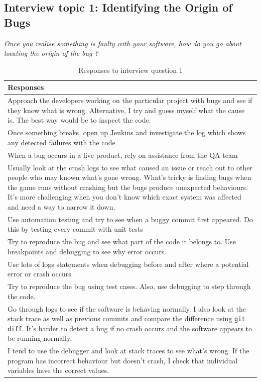 \documentclass[../main.tex]{subfiles}
\begin{document}
\subsection{Interview topic 1: Identifying the Origin of Bugs}

\textit{Once you realise something is faulty with your software, how do you go about locating the origin of the bug ?}

\begin{table}[H]
\centering
\caption{Responses to interview question 1}
    \begin{tabular}{|p{15cm}|}
        \hline
        \textbf{Responses}\\ 
        \hline\hline
        Approach the developers working on the particular project with bugs and see if they know what is wrong. Alternative, I try and guess myself what the cause is. The best way would be to inspect the code.\\
        \hline
        Once something breaks, open up Jenkins and investigate the log which shows any detected failures with the code\\
        \hline
        When a bug occurs in a live product, rely on assistance from the QA team\\
        \hline
        Usually look at the crash logs to see what caused an issue or reach out to other people who may known what's gone wrong. What's tricky is finding bugs when the game runs without crashing but the bugs produce unexpected behaviours. It's more challenging when you don't know which exact system was affected and need a way to narrow it down.\\
        \hline
        Use automation testing and try to see when a buggy commit first appeared. Do this by testing every commit with unit tests\\
        \hline
        Try to reproduce the bug and see what part of the code it belongs to. Use breakpoints and debugging to see why error occurs.\\
        \hline
        Use lots of logs statements when debugging before and after where a potential error or crash occurs\\
        \hline
        Try to reproduce the bug using test cases. Also, use debugging to step through the code.\\
        \hline
        Go through logs to see if the software is behaving normally. I also look at the stack trace as well as previous commits and compare the difference using \texttt{git diff}. It's harder to detect a bug if no crash occurs and the software appears to be running normally. \\
        \hline
        I tend to use the debugger and look at stack traces to see what's wrong. If the program has incorrect behaviour but doesn't crash, I check that individual variables have the correct values. \\
        \hline
    \end{tabular}
\label{table:rq4Table1}
\end{table}
\end{document}
